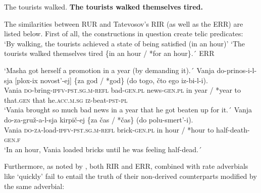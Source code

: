 \documentclass[output=paper,colorlinks,citecolor=brown,modfonts,nonflat]{langsci/langscibook}
\begin{document}
\ea%
    \label{ex:antonyuk:36}
    \ea \label{ex:antonyuk:36a}
    The tourists walked.
    \ex \label{ex:antonyuk:36b}
    \textbf{The tourists walked themselves tired.}
    \z
\z

The similarities between RUR and Tatevosov’s RIR (as well as the ERR) are listed below. First of all, the constructions in question create telic predicates:\\

\ea%
    \label{ex:antonyuk:37}
    \glt    ‘By walking, the tourists achieved a state of being satisfied (in an hour)’
    \ex \label{ex:antonyuk:37b}
    `The tourists walked themselves tired \{in an hour / *for an hour\}.´ \hfill{ERR}
    \z
\z

\ea%
    \label{ex:antonyuk:38}
    \glt    `Masha got herself  a promotion in a year (by demanding it).´
    \ex \label{ex:antonyuk:38b}
    \gll    Vanja do-prinos-i-l-sja [plox-ix novost’-ej] \{za god / *god\} (do togo, čto ego iz-bi-l-i).\\
            Vania \textsc{do-}bring\textsc{-ipfv-pst.sg.m-refl} \hspaceThis{[}bad\textsc{-gen.pl} news\textsc{-gen.pl} in year / *year to that\textsc{.gen} that he\textsc{.acc.m.sg} \textsc{iz-}beat\textsc{-pst-pl}\\
    \glt    `Vania brought so much bad news in a year that he got beaten up for it.´
    \ex \label{ex:antonyuk:38c}
    \gll    Vanja do-za-gruž-a-l-sja kirpič-ej \{za čas / *čas\} (do polu-smert’-i).\\
            Vania \textsc{do-za-}load\textsc{-ipfv-pst.sg.m-refl} brick\textsc{-gen.pl} in hour / *hour to half-death\textsc{-gen.f}\\
    \glt    `In an hour, Vania loaded bricks until he was feeling half-dead.´
    \z
\z

Furthermore, as noted by \citeauthor{Tatevosov2010}, both RIR and ERR, combined with rate adverbials like ‘quickly’ fail to entail the truth of their non-derived counterparts modified by the same adverbial:
\end{document}
